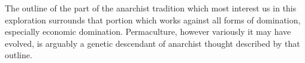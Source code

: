 \documentclass[a4paper, 11pt]{article}
\begin{document}
 The outline of the part of the anarchist tradition which most interest us in this exploration surrounds that portion which works against all forms of domination, especially economic domination.  Permaculture, however variously it may have evolved, is arguably a genetic descendant of anarchist thought described by that outline.
\end{document}

